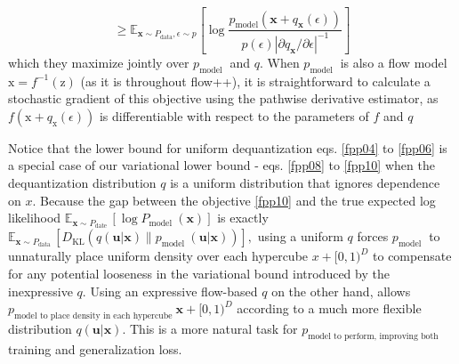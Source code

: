 \documentclass[]{IEEEtran}
\begin{document}
\begin{equation}
\geq \mathbb{E}_{\mathbf{x} \sim P_{\mathrm{data}}, \epsilon \sim p}\left[\log \frac{p_{\operatorname{model}}\left(\mathbf{x}+q_{\mathbf{x}}(\epsilon)\right)}{p(\epsilon)\left|\partial q_{\mathbf{x}} / \partial \epsilon\right|^{-1}}\right]
\label{fpp12}
\end{equation}
which they maximize jointly over $p_{\text {model }}$ and $q .$ When $p_{\text {model }}$ is also a flow model $\mathrm{x}=f^{-1}(\mathrm{z})$ (as it is throughout flow++), it is straightforward to calculate a stochastic gradient of this objective using the pathwise derivative estimator, as $f\left(\mathrm{x}+q_{\mathrm{x}}(\epsilon)\right)$ is differentiable with respect to the parameters of $f$ and $q$

Notice that the lower bound for uniform dequantization eqs. \ref{fpp04} to \ref{fpp06} is a special case of our variational lower bound - eqs. \ref{fpp08} to \ref{fpp10} when the dequantization distribution $q$ is a uniform distribution that ignores dependence on $x$. Because the gap between the objective \ref{fpp10} and the true expected log likelihood $\mathbb{E}_{\mathbf{x} \sim P_{\text {date }}}\left[\log P_{\text {model }}(\mathbf{x})\right]$ is exactly $\mathbb{E}_{\mathbf{x} \sim P_{\text {data }}}\left[D_{\mathrm{KL}}\left(q(\mathbf{u} | \mathbf{x}) \| p_{\text {model }}(\mathbf{u} | \mathbf{x})\right)\right],$ using a uniform $q$
forces $p_{\text {model }}$ to unnaturally place uniform density over each hypercube $x+[0,1)^{D}$ to compensate for any potential looseness in the variational bound introduced by the inexpressive $q .$ Using an expressive flow-based $q$ on the other hand, allows $p_{\text {model to place density in each hypercube }} \mathbf{x}+[0,1)^{D}$ according to a much more flexible distribution $q(\mathbf{u} | \mathbf{x})$. This is a more natural task for $p_{\text {model to perform, improving both }}$ training and generalization loss.
\end{document}
